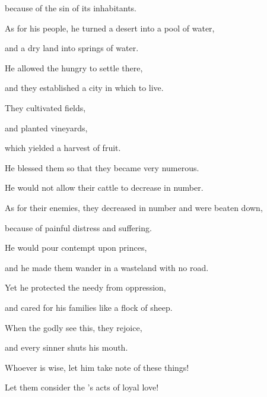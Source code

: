 {\par }{\Q because of the sin of its inhabitants.
\par }{\Q {}As for his people, he turned
a desert
into a pool
of water,
\par }{\Q and a dry
land
into springs
of water.
\par }{\Q {}He allowed the hungry
to settle
there,
\par }{\Q and they established
a city
in which to live.
\par }{\Q {}They cultivated
fields,
\par }{\Q and planted
vineyards,
\par }{\Q which yielded
a harvest
of fruit.
\par }{\Q {}He blessed
them so
that they became very
numerous.
\par }{\Q He would not
allow their cattle
to decrease in number.
\par }{\Q {}As for their
enemies, they decreased
in number and were beaten down,
\par }{\Q because of painful
distress and suffering.
\par }{\Q {}He would pour
contempt
upon
princes,
\par }{\Q and he made them wander
in a wasteland
with no
road.
\par }{\Q {}Yet he protected
the needy
from oppression,
\par }{\Q and cared
for his families
like a flock of sheep.
\par }{\Q {}When the godly
see
this, they rejoice,
\par }{\Q and every
sinner
shuts
his mouth.
\par }{\Q {}Whoever
is wise,
let him take note
of these
things!
\par }{\Q Let them consider
the
{}’s
acts of loyal love!


\par }
